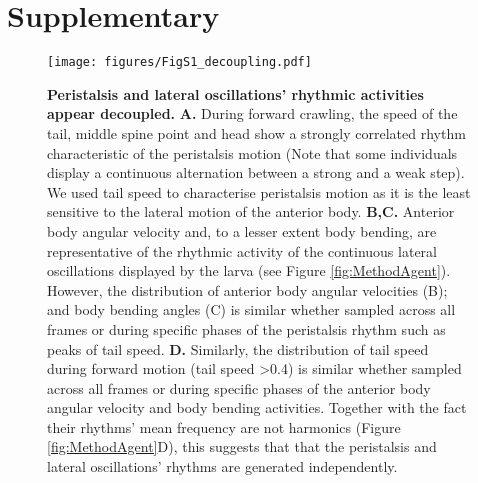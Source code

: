 


\section{Supplementary}
\beginsupplement


\begin{figure}
\begin{center}
\texttt{[image: figures/FigS1\_decoupling.pdf]}
\caption{{\bf Peristalsis and lateral oscillations’ rhythmic activities appear decoupled.} {\bf A.} During forward crawling, the speed of the tail, middle spine point and head show a strongly correlated rhythm characteristic of the peristalsis motion (Note that some individuals display a continuous alternation between a strong and a weak step). We used tail speed to characterise peristalsis motion as it is the least sensitive to the lateral motion of the anterior body.
{\bf B,C.} Anterior body angular velocity and, to a lesser extent body bending, are representative of the rhythmic activity of the continuous lateral oscillations displayed by the larva (see Figure \ref{fig:MethodAgent}). However, the distribution of anterior body angular velocities (B); and body bending angles (C) is similar whether sampled across all frames or during specific phases of the peristalsis rhythm such as peaks of tail speed. {\bf D.} Similarly, the distribution of tail speed during forward motion (tail speed >0.4) is similar whether sampled across all frames or during specific phases of the anterior body angular velocity and body bending activities. Together with the fact their rhythms’ mean frequency are not harmonics (Figure \ref{fig:MethodAgent}D), this suggests that that the peristalsis and lateral oscillations’ rhythms are generated independently. 
 \label{fig:FigS2}}
\end{center}
\end{figure}





